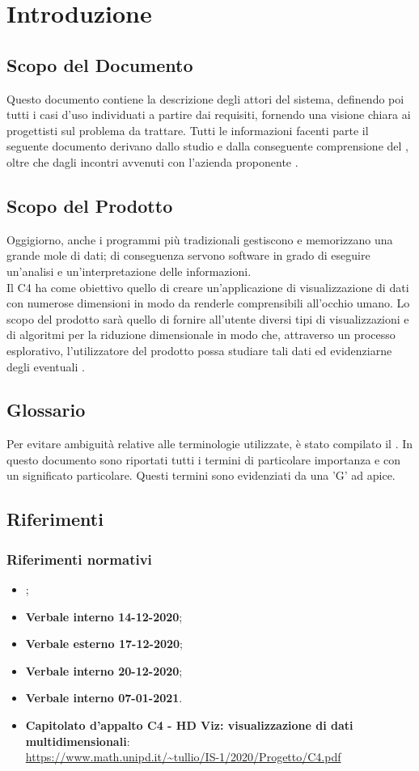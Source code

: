 \section{Introduzione}
\subsection{Scopo del Documento}
Questo documento contiene la descrizione degli attori del sistema, definendo poi tutti i casi d'uso individuati a partire dai requisiti, fornendo una visione chiara ai progettisti sul problema da trattare. Tutti le informazioni facenti parte il seguente documento derivano dallo studio e dalla conseguente comprensione del , oltre che dagli incontri avvenuti con l'azienda proponente \Proponente{}.
\subsection{Scopo del Prodotto}
Oggigiorno, anche i programmi più tradizionali gestiscono e memorizzano una grande mole di dati; di conseguenza servono software in grado di eseguire un'analisi e un'interpretazione delle informazioni.\\
Il  C4 ha come obiettivo quello di creare un'applicazione di visualizzazione di dati con numerose dimensioni in modo da renderle comprensibili all'occhio umano.  Lo scopo del prodotto sarà quello di fornire all'utente diversi tipi di visualizzazioni e di algoritmi per la riduzione dimensionale in modo che, attraverso un processo esplorativo, l'utilizzatore del prodotto possa studiare tali dati ed evidenziarne degli eventuali . 
\subsection{Glossario}
Per evitare ambiguità relative alle terminologie utilizzate, è stato compilato il . In questo documento sono riportati tutti i termini di particolare importanza e con un significato particolare. Questi termini sono evidenziati da una 'G' ad apice.
\subsection{Riferimenti}
\subsubsection{Riferimenti normativi}
\begin{itemize}
	\item \textbf{};
	\item \textbf{Verbale interno 14-12-2020};
	\item \textbf{Verbale esterno 17-12-2020};
	\item \textbf{Verbale interno 20-12-2020};
	\item \textbf{Verbale interno 07-01-2021}.
	\item \textbf{Capitolato d'appalto C4 - HD Viz: visualizzazione di dati multidimensionali}:\\
	\textcolor{blue}{\url{https://www.math.unipd.it/~tullio/IS-1/2020/Progetto/C4.pdf}}
\end{itemize}

